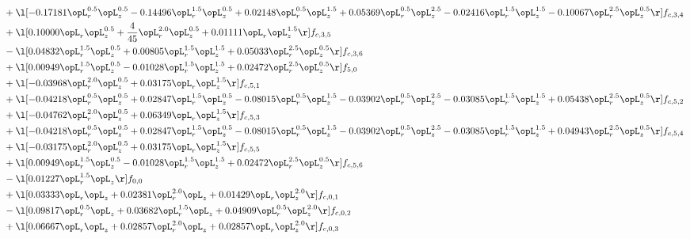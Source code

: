 \begin{alignat}{2}
& + \l[  -0.17181 \opL_r^{0.5} \opL_z^{0.5}   -0.14496 \opL_r^{1.5} \opL_z^{0.5} +  0.02148 \opL_r^{0.5} \opL_z^{1.5} +  0.05369 \opL_r^{0.5} \opL_z^{2.5}   -0.02416 \opL_r^{1.5} \opL_z^{1.5}   -0.10067 \opL_r^{2.5} \opL_z^{0.5}  \r] f_{c,3,4} \nonumber \\ 
& + \l[  0.10000 \opL_r \opL_z^{0.5} + \frac{4}{45} \opL_r^{2.0} \opL_z^{0.5} +  0.01111 \opL_r \opL_z^{1.5}  \r] f_{c,3,5} \nonumber \\ 
& - \l[  0.04832 \opL_r^{1.5} \opL_z^{0.5} +  0.00805 \opL_r^{1.5} \opL_z^{1.5} +  0.05033 \opL_r^{2.5} \opL_z^{0.5}  \r] f_{c,3,6} \nonumber \\ 
& + \l[  0.00949 \opL_r^{1.5} \opL_z^{0.5}   -0.01028 \opL_r^{1.5} \opL_z^{1.5} +  0.02472 \opL_r^{2.5} \opL_z^{0.5}  \r] f_{5,0} \nonumber \\ 
& + \l[  -0.03968 \opL_r^{2.0} \opL_z^{0.5} +  0.03175 \opL_r \opL_z^{1.5}  \r] f_{c,5,1} \nonumber \\ 
& + \l[  -0.04218 \opL_r^{0.5} \opL_z^{0.5} +  0.02847 \opL_r^{1.5} \opL_z^{0.5}   -0.08015 \opL_r^{0.5} \opL_z^{1.5}   -0.03902 \opL_r^{0.5} \opL_z^{2.5}   -0.03085 \opL_r^{1.5} \opL_z^{1.5} +  0.05438 \opL_r^{2.5} \opL_z^{0.5}  \r] f_{c,5,2} \nonumber \\ 
& + \l[  -0.04762 \opL_r^{2.0} \opL_z^{0.5} +  0.06349 \opL_r \opL_z^{1.5}  \r] f_{c,5,3} \nonumber \\ 
& + \l[  -0.04218 \opL_r^{0.5} \opL_z^{0.5} +  0.02847 \opL_r^{1.5} \opL_z^{0.5}   -0.08015 \opL_r^{0.5} \opL_z^{1.5}   -0.03902 \opL_r^{0.5} \opL_z^{2.5}   -0.03085 \opL_r^{1.5} \opL_z^{1.5} +  0.04943 \opL_r^{2.5} \opL_z^{0.5}  \r] f_{c,5,4} \nonumber \\ 
& + \l[  -0.03175 \opL_r^{2.0} \opL_z^{0.5} +  0.03175 \opL_r \opL_z^{1.5}  \r] f_{c,5,5} \nonumber \\ 
& + \l[  0.00949 \opL_r^{1.5} \opL_z^{0.5}   -0.01028 \opL_r^{1.5} \opL_z^{1.5} +  0.02472 \opL_r^{2.5} \opL_z^{0.5}  \r] f_{c,5,6} \nonumber \\ 
& - \l[  0.01227 \opL_r^{1.5} \opL_z  \r] f_{0,0} \nonumber \\ 
& + \l[  0.03333 \opL_r \opL_z +  0.02381 \opL_r^{2.0} \opL_z +  0.01429 \opL_r \opL_z^{2.0}  \r] f_{c,0,1} \nonumber \\ 
& - \l[  0.09817 \opL_r^{0.5} \opL_z +  0.03682 \opL_r^{1.5} \opL_z +  0.04909 \opL_r^{0.5} \opL_z^{2.0}  \r] f_{c,0,2} \nonumber \\ 
& + \l[  0.06667 \opL_r \opL_z +  0.02857 \opL_r^{2.0} \opL_z +  0.02857 \opL_r \opL_z^{2.0}  \r] f_{c,0,3} \nonumber \\ 

\end{alignat}
